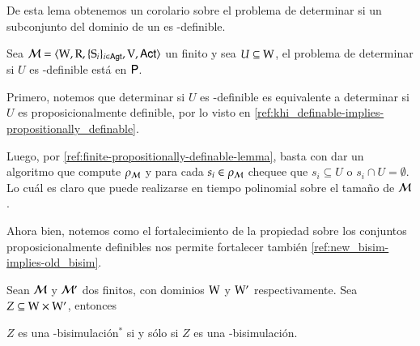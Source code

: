 De esta lema obtenemos un corolario sobre el problema de determinar si un subconjunto del dominio de un \ults es \KHilogic-definible.

\begin{corolario}
    Sea $\mathcal{M}=\langle \mathrm{W},\mathrm{R},\{ \mathrm{S}_i \}_{i \in {\rm \sf Agt}},\mathrm{V},{\rm \sf Act} \rangle$ un \ults finito y sea $U \subseteq \mathrm{W}$, el problema de determinar si $U$ es 
    \KHilogic-definible está en $\rm\textsf{P}$.
\end{corolario}

\begin{demostracion}

    Primero, notemos que determinar si $U$ es \KHilogic-definible es equivalente a determinar si $U$ es proposicionalmente definible, por lo visto en 
    \ref{ref:khi_definable-implies-propositionally_definable}.

    Luego, por \ref{ref:finite-propositionally-definable-lemma}, basta con dar un algoritmo que compute $\rho_{\mathcal{M}}$ y para cada $s_i \in \rho_{\mathcal{M}}$ 
    chequee que $s_i \subseteq U$ o $s_i \cap U = \emptyset$. Lo cuál es claro que puede realizarse en tiempo polinomial sobre el tamaño de $\mathcal{M}$.
\end{demostracion}

Ahora bien, notemos como el fortalecimiento de la propiedad sobre los conjuntos proposicionalmente definibles nos permite fortalecer también \ref{ref:new_bisim-implies-old_bisim}.

\begin{lema}\label{ref:finite-old_bisim-implies-new_bisim}
    Sean $\mathcal{M}$ y $\mathcal{M}'$ dos \ultss finitos, con dominios $\mathrm{W}$ y $\mathrm{W}'$ respectivamente. Sea $Z \subseteq \mathrm{W} \times \mathrm{W}'$, entonces 
    \begin{center}
        $Z$ es una \KHilogic-bisimulación$^*$ si y sólo si $Z$ es una \KHilogic-bisimulación.
    \end{center}
\end{lema}

